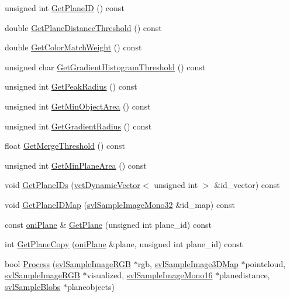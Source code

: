 \begin{DoxyCompactItemize}
\item 
unsigned int \hyperlink{classoni_plane_segmentation_a77df8f8ea6702c4bd91b90462f3ba676}{Get\-Plane\-I\-D} () const 
\item 
double \hyperlink{classoni_plane_segmentation_a0ee73bd8d537cb67dc763fb7634a8ddb}{Get\-Plane\-Distance\-Threshold} () const 
\item 
double \hyperlink{classoni_plane_segmentation_aee5548fe14064ad19eda72cc0e0bd901}{Get\-Color\-Match\-Weight} () const 
\item 
unsigned char \hyperlink{classoni_plane_segmentation_adec2be8920b90abdc6557c9c4884601d}{Get\-Gradient\-Histogram\-Threshold} () const 
\item 
unsigned int \hyperlink{classoni_plane_segmentation_a35015761155ea15da524ac29c2f082d7}{Get\-Peak\-Radius} () const 
\item 
unsigned int \hyperlink{classoni_plane_segmentation_af470c18810d8fe86992f269c5c9abd5b}{Get\-Min\-Object\-Area} () const 
\item 
unsigned int \hyperlink{classoni_plane_segmentation_ad392ec1b243dd02b9729280909aae4a3}{Get\-Gradient\-Radius} () const 
\item 
float \hyperlink{classoni_plane_segmentation_a039fe6d9c39d26fd727d53f355c3c695}{Get\-Merge\-Threshold} () const 
\item 
unsigned int \hyperlink{classoni_plane_segmentation_a55c1b6224d3b69d452ef7ce0ef4bef6e}{Get\-Min\-Plane\-Area} () const 
\item 
void \hyperlink{classoni_plane_segmentation_a576defa5e03da9cd55bd04a950699f70}{Get\-Plane\-I\-Ds} (\hyperlink{classvct_dynamic_vector}{vct\-Dynamic\-Vector}$<$ unsigned int $>$ \&id\-\_\-vector) const 
\item 
void \hyperlink{classoni_plane_segmentation_ae65059a4f610673275c62becf478f173}{Get\-Plane\-I\-D\-Map} (\hyperlink{svl_sample_image_types_8h_ac5d9d107eabb65b55f67d2a70ccf2cd6}{svl\-Sample\-Image\-Mono32} \&id\-\_\-map) const 
\item 
const \hyperlink{classoni_plane}{oni\-Plane} \& \hyperlink{classoni_plane_segmentation_ae06c149b27938a8235287f42caa7c277}{Get\-Plane} (unsigned int plane\-\_\-id) const 
\item 
int \hyperlink{classoni_plane_segmentation_a1c8c319dd4a274c87e185a99922a069d}{Get\-Plane\-Copy} (\hyperlink{classoni_plane}{oni\-Plane} \&plane, unsigned int plane\-\_\-id) const 
\item 
bool \hyperlink{classoni_plane_segmentation_a9cdf5e3553c9a1df960bf5213bfde290}{Process} (\hyperlink{svl_sample_image_types_8h_a54a55112dd3879f71f990d2945375f1a}{svl\-Sample\-Image\-R\-G\-B} $\ast$rgb, \hyperlink{svl_sample_image_types_8h_a3e34d5c72fa0d2a079d24e0668358bfc}{svl\-Sample\-Image3\-D\-Map} $\ast$pointcloud, \hyperlink{svl_sample_image_types_8h_a54a55112dd3879f71f990d2945375f1a}{svl\-Sample\-Image\-R\-G\-B} $\ast$visualized, \hyperlink{svl_sample_image_types_8h_a0d4a39c480e3245d7f92d6699aa17848}{svl\-Sample\-Image\-Mono16} $\ast$planedistance, \hyperlink{classsvl_sample_blobs}{svl\-Sample\-Blobs} $\ast$planeobjects)

\end{DoxyCompactItemize}
